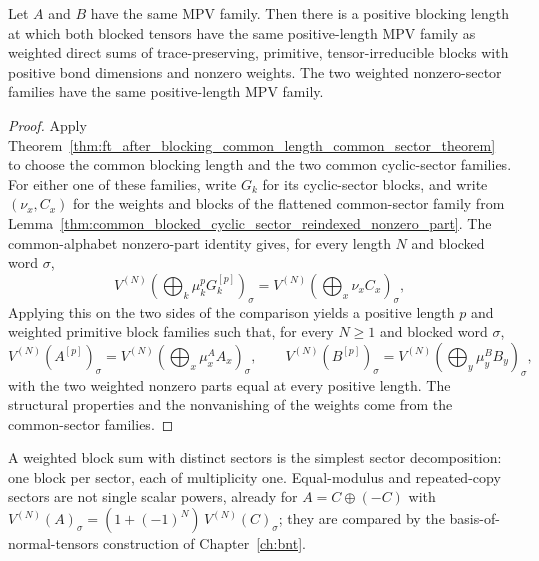 \begin{theorem}%
    \label{thm:unconditional_common_primitive_irreducible_blocks}
    \leanok
    Let $A$ and $B$ have the same MPV family. Then there is a positive blocking
    length at which both blocked tensors have the same positive-length MPV
    family as weighted direct sums of trace-preserving, primitive,
    tensor-irreducible blocks with positive bond dimensions and nonzero weights.
    The two weighted nonzero-sector families have the same positive-length MPV
    family.
\end{theorem}

\begin{proof}
    \leanok
    Apply
    Theorem~\ref{thm:ft_after_blocking_common_length_common_sector_theorem} to
    choose the common blocking length and the two common cyclic-sector families.
    For either one of these families, write $G_k$ for its cyclic-sector blocks,
    and write $(\nu_x,C_x)$ for the weights and blocks of the flattened
    common-sector family from
    Lemma~\ref{thm:common_blocked_cyclic_sector_reindexed_nonzero_part}. The
    common-alphabet nonzero-part identity gives, for every length $N$ and
    blocked word $\sigma$,
    \[
        V^{(N)}\!(\textstyle\bigoplus_k \mu_k^p G_k^{[p]})_\sigma
        =
        V^{(N)}\!(\textstyle\bigoplus_x \nu_x C_x)_\sigma ,
    \]
    Applying this on the two sides of the comparison yields a positive length
    $p$ and weighted primitive block families such that, for every $N\ge 1$ and
    blocked word $\sigma$,
    \[
        V^{(N)}\!(A^{[p]})_\sigma
        =
        V^{(N)}\!(\textstyle\bigoplus_x \mu^A_x A_x)_\sigma,
        \qquad
        V^{(N)}\!(B^{[p]})_\sigma
        =
        V^{(N)}\!(\textstyle\bigoplus_y \mu^B_y B_y)_\sigma,
    \]
    with the two weighted nonzero parts equal at every positive length. The
    structural properties and the nonvanishing of the weights come from the
    common-sector families.
\end{proof}

A weighted block sum with distinct sectors is the simplest sector decomposition:
one block per sector, each of multiplicity one. Equal-modulus and repeated-copy
sectors are not single scalar powers, already for $A = C \oplus (-C)$ with
$V^{(N)}(A)_\sigma = (1 + (-1)^N)\,V^{(N)}(C)_\sigma$; they are compared by the
basis-of-normal-tensors construction of Chapter~\ref{ch:bnt}.

